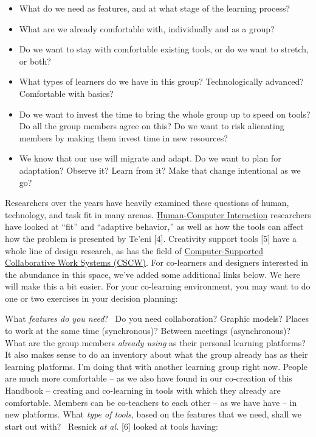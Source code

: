 \begin{itemize}
\itemsep1pt\parskip0pt
\item
  What do we need as features, and at what stage of the learning
  process?
\item
  What are we already comfortable with, individually and as a group?
\item
  Do we want to stay with comfortable existing tools, or do we want to
  stretch, or both?
\item
  What types of learners do we have in this group? Technologically
  advanced? Comfortable with basics?
\item
  Do we want to invest the time to bring the whole group up to speed on
  tools? Do all the group members agree on this? Do we want to risk
  alienating members by making them invest time in new resources?
\item
  We know that our use will migrate and adapt. Do we want to plan for
  adaptation? Observe it? Learn from it? Make that change intentional as
  we go?
\end{itemize}

Researchers over the years have heavily examined these questions of
human, technology, and task fit in many arenas.
\href{http://en.wikipedia.org/wiki/Human-Computer_Interaction}{Human-Computer
Interaction} researchers have looked at ``fit'' and ``adaptive
behavior,'' as well as how the tools can affect how the problem is
presented by Te'eni {[}4{]}. Creativity support tools {[}5{]} have a
whole line of design research, as has the field of
\href{http://en.wikipedia.org/wiki/Computer-supported_cooperative_work}{Computer-Supported
Collaborative Work Systems (CSCW)}. For co-learners and designers
interested in the abundance in this space, we've added some additional
links below. We here will make this a bit easier. For your co-learning
environment, you may want to do one or two exercises in your decision
planning:

What \emph{features do you need}?~ Do you need collaboration? Graphic
models? Places to work at the same time (synchronous)? Between meetings
(asynchronous)? What are the group members \emph{already using} as their
personal learning platforms? It also makes sense to do an inventory
about what the group already has as their learning platforms. I'm doing
that with another learning group right now. People are much more
comfortable -- as we also have found in our co-creation of this Handbook
-- creating and co-learning in tools with which they already are
comfortable. Members can be co-teachers to each other -- as we have have
-- in new platforms. What \emph{type of tools}, based on the features
that we need, shall we start out with?~ Resnick \emph{at al.} {[}6{]}
looked at tools having:

